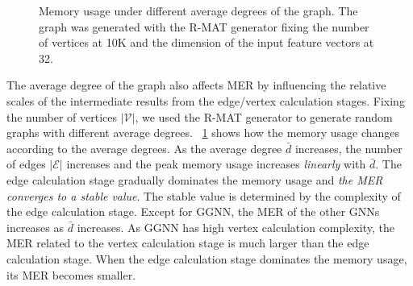 \begin{figure}[tbp]
    \centering
    \caption{Memory usage under different average degrees of the graph. The graph was generated with the R-MAT generator fixing the number of vertices at 10K and the dimension of the input feature vectors at 32.}
    \label{fig:exp_memory_expansion_ratio_input_graph_number_of_edges}
\end{figure}

The average degree of the graph also affects MER by influencing the relative scales of the intermediate results from the edge/vertex calculation stages.
Fixing the number of vertices $|\mathcal{V}|$, we used the R-MAT generator to generate random graphs with different average degrees.
\figurename~\ref{fig:exp_memory_expansion_ratio_input_graph_number_of_edges} shows how the memory usage changes according to the average degrees.
As the average degree $\bar{d}$ increases, the number of edges $|\mathcal{E}|$ increases and the peak memory usage increases \emph{linearly} with $\bar{d}$.
The edge calculation stage gradually dominates the memory usage and \emph{the MER converges to a stable value}.
The stable value is determined by the complexity of the edge calculation stage.
Except for GGNN, the MER of the other GNNs increases as $\bar{d}$ increases.
As GGNN has high vertex calculation complexity, the MER related to the vertex calculation stage is much larger than the edge calculation stage.
When the edge calculation stage dominates the memory usage, its MER becomes smaller.

